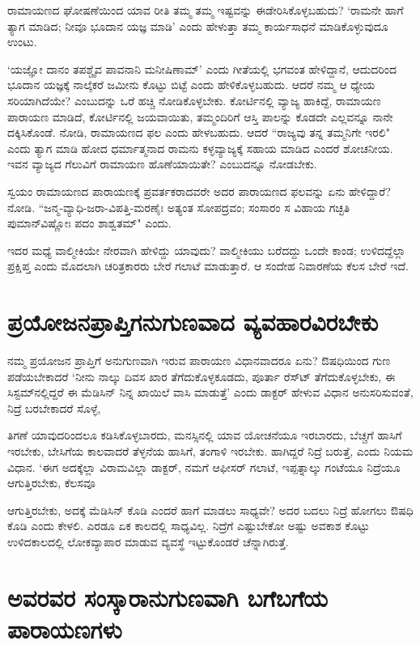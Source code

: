 ರಾಮಾಯಣದ ಘೋಷಣೆಯಿಂದ ಯಾವ ರೀತಿ ತಮ್ಮ ತಮ್ಮ ಇಷ್ಟವನ್ನು ಈಡೇರಿಸಿಕೊಳ್ಳಬಹುದು? `ರಾಮನೇ ಹಾಗೆ ತ್ಯಾಗ ಮಾಡಿದ; ನೀವೂ ಭೂದಾನ ಯಜ್ಞ ಮಾಡಿ' ಎಂದು ಹೇಳುತ್ತಾ ತಮ್ಮ ಕಾರ್ಯಸಾಧನೆ ಮಾಡಿಕೊಳ್ಳುವುದೂ ಉಂಟು. 


`ಯಜ್ಞೋ ದಾನಂ ತಪಶ್ಚೈವ ಪಾವನಾನಿ ಮನೀಷಿಣಾಮ್‍' ಎಂದು ಗೀತೆಯಲ್ಲಿ ಭಗವಂತ ಹೇಳಿದ್ದಾನೆ, ಆದುದರಿಂದ ಭೂದಾನ ಯಜ್ಞಕ್ಕೆ ನಾಲ್ಕೆಕರೆ ಜಮೀನು ಕೊಟ್ಟು ಬಿಟ್ಟೆ ಎಂದು ಹೇಳಿಕೊಳ್ಳಬಹುದು. ಆದರೆ ನಮ್ಮ ಆ ಧ್ಯೇಯ ಸರಿಯಾಗಿದೆಯೇ? ಎಂಬುದನ್ನು ಒರೆ ಹಚ್ಚಿ ನೋಡಿಕೊಳ್ಳಬೇಕು. ಕೋರ್ಟಿನಲ್ಲಿ ವ್ಯಾಜ್ಯ ಹಾಕಿದ್ದೆ, ರಾಮಾಯಣ ಪಾರಾಯಣ ಮಾಡಿದೆ, ಕೋರ್ಟಿನಲ್ಲಿ ಜಯವಾಯಿತು, ತಮ್ಮಂದಿರಿಗೆ ಆಸ್ತಿ ಪಾಲನ್ನು ಕೊಡದೇ ಎಲ್ಲವನ್ನೂ ನಾನೇ ದಕ್ಕಿಸಿಕೊಂಡೆ. ನೋಡಿ, ರಾಮಾಯಣದ ಫಲ ಎಂದು ಹೇಳಬಹುದು. ಆದರೆ ``ರಾಜ್ಯವು ತನ್ನ ತಮ್ಮನಿಗೇ ಇರಲಿ" ಎಂದು ತ್ಯಾಗ ಮಾಡಿ ಹೋದ ಧರ್ಮಾತ್ಮನಾದ ರಾಮನು ಕಳ್ಳವ್ಯಾಜ್ಯಕ್ಕೆ ಸಹಾಯ ಮಾಡಿದ ಎಂದರೆ ಶೋಚನೀಯ. ಇವನ ವ್ಯಾಜ್ಯದ ಗೆಲುವಿಗೆ ರಾಮಾಯಣ ಹೊಣೆಯಾಯಿತೇ? ಎಂಬುದನ್ನೂ ನೋಡಬೇಕು. 


ಸ್ವಯಂ ರಾಮಾಯಣದ ಪಾರಾಯಣಕ್ಕೆ ಪ್ರವರ್ತಕರಾದವರೇ ಅದರ ಪಾರಾಯಣದ ಫಲವನ್ನು ಏನು ಹೇಳಿದ್ದಾರೆ? ನೋಡಿ. ``ಜನ್ಮ-ವ್ಯಾಧಿ-ಜರಾ-ವಿಪತ್ತಿ-ಮರಣೈಃ \label{173} ಅತ್ಯಂತ ಸೋಪದ್ರವಂ; ಸಂಸಾರಂ ಸ ವಿಹಾಯ ಗಚ್ಛತಿ ಪುಮಾನ್‍ವಿಷ್ಣೋಃ ಪದಂ ಶಾಶ್ವತಮ್‍" ಎಂದು. 


ಇದರ ಮಧ್ಯೆ ವಾಲ್ಮೀಕಿಯೇ ನೇರವಾಗಿ ಹೇಳಿದ್ದು ಯಾವುದು? ವಾಲ್ಮೀಕಿಯು ಬರೆದದ್ದು ಒಂದೇ ಕಾಂಡ; ಉಳಿದದ್ದೆಲ್ಲಾ ಪ್ರಕ್ಷಿಪ್ತ ಎಂದು ಮೊದಲಾಗಿ ಚರಿತ್ರಕಾರರು ಬೇರೆ ಗಲಾಟೆ ಮಾಡುತ್ತಾರೆ. ಆ ಸಂದೇಹ ನಿವಾರಣೆಯ ಕೆಲಸ ಬೇರೆ ಇದೆ. 


\section*{ಪ್ರಯೋಜನಪ್ರಾಪ್ತಿಗನುಗುಣವಾದ ವ್ಯವಹಾರವಿರಬೇಕು} 


ನಮ್ಮ ಪ್ರಯೋಜನ ಪ್ರಾಪ್ತಿಗೆ ಅನುಗುಣವಾಗಿ ಇರುವ ಪಾರಾಯಣ ವಿಧಾನವಾದರೂ ಏನು? ಔಷಧಿಯಿಂದ ಗುಣ ಪಡೆಯಬೇಕಾದರೆ `ನೀನು ನಾಲ್ಕು ದಿವಸ ಖಾರ ತೆಗೆದುಕೊಳ್ಳಕೂಡದು, ಪೂರ್ತಾ ರೆಸ್ಟ್‍ ತೆಗೆದುಕೊಳ್ಳಬೇಕು, ಈ ಸಿಸ್ಟಮ್‍ನಲ್ಲಿದ್ದರೆ ಈ ಮೆಡಿಸಿನ್‍ ನಿನ್ನ ಖಾಯಿಲೆ ವಾಸಿ ಮಾಡುತ್ತೆ' ಎಂದು ಡಾಕ್ಟರ್‍ ಹೇಳುವ ವಿಧಾನ ಅನುಸರಿಸುವಂತೆ, ನಿದ್ರೆ ಬರಬೇಕಾದರೆ ಸೊಳ್ಳೆ, 

ತಿಗಣೆ ಯಾವುದರಿಂದಲೂ ಕಡಿಸಿಕೊಳ್ಳಬಾರದು, ಮನಸ್ಸಿನಲ್ಲಿ ಯಾವ ಯೋಚನೆಯೂ ಇರಬಾರದು, ಬೆಚ್ಚಗೆ ಹಾಸಿಗೆ ಇರಬೇಕು, ಬೇಸಿಗೆಯ ಕಾಲವಾದರೆ ತೆಳ್ಳನೆಯ ಹಾಸಿಗೆ, ತಂಗಾಳಿ ಇರಬೇಕು. ಹಾಗಿದ್ದರೆ ನಿದ್ರೆ ಬರುತ್ತೆ, ಎಂದು ನಿಯಮ ವಿಧಾನ. `ಈಗ ಅದಕ್ಕೆಲ್ಲಾ ವಿರಾಮವಿಲ್ಲಾ ಡಾಕ್ಟರ್‍, ನಮಗೆ ಆಫೀಸರ್‍ ಗಲಾಟೆ, ಇಪ್ಪತ್ನಾಲ್ಕು ಗಂಟೆಯೂ ನಿದ್ರೆಯೂ ಆಗುತ್ತಿರಬೇಕು, ಕೆಲಸವೂ 

ಆಗುತ್ತಿರಬೇಕು, ಅದಕ್ಕೆ ಮೆಡಿಸಿನ್‍ ಕೊಡಿ ಎಂದರೆ ಹಾಗೆ ಮಾಡಲು ಸಾಧ್ಯವೇ? ಅದರ ಬದಲು ನಿದ್ರೆ ಹೋಗಲು ಔಷಧಿ ಕೊಡಿ ಎಂದು ಕೇಳಲಿ. ಎರಡೂ ಏಕ ಕಾಲದಲ್ಲಿ ಸಾಧ್ಯವಿಲ್ಲ. ನಿದ್ರೆಗೆ ಎಷ್ಟುಬೇಕೋ ಅಷ್ಟು ಅವಕಾಶ ಕೊಟ್ಟು ಉಳಿದಕಾಲದಲ್ಲಿ ಲೋಕವ್ಯಾಪಾರ ಮಾಡುವ ವ್ಯವಸ್ಥೆ ಇಟ್ಟುಕೊಂಡರೆ ಚೆನ್ನಾಗಿರುತ್ತೆ. 


\section*{ಅವರವರ ಸಂಸ್ಕಾರಾನುಗುಣವಾಗಿ ಬಗೆಬಗೆಯ ಪಾರಾಯಣಗಳು} 


